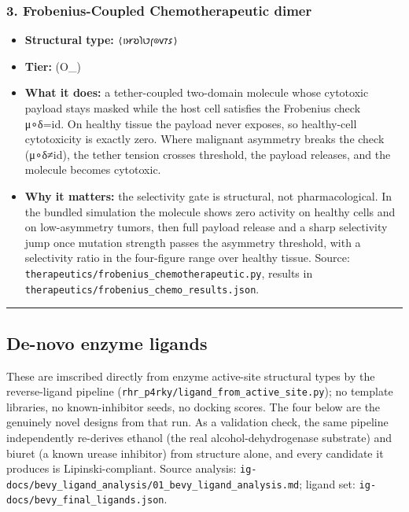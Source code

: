 \hypertarget{frobenius-coupled-chemotherapeutic-dimer}{%
\subsubsection{3. Frobenius-Coupled Chemotherapeutic
dimer}\label{frobenius-coupled-chemotherapeutic-dimer}}

\begin{itemize}
\tightlist
\item
  \textbf{Structural type:} \texttt{⟨𐑦𐑶𐑾𐑹𐑐𐑧𐑲𐑝⊙𐑫𐑳𐑭⟩}
\item
  \textbf{Tier:} (O\_\infty)
\item
  \textbf{What it does:} a tether-coupled two-domain molecule whose
  cytotoxic payload stays masked while the host cell satisfies the
  Frobenius check μ∘δ=id. On healthy tissue the payload never exposes,
  so healthy-cell cytotoxicity is exactly zero. Where malignant
  asymmetry breaks the check (μ∘δ≠id), the tether tension crosses
  threshold, the payload releases, and the molecule becomes cytotoxic.
\item
  \textbf{Why it matters:} the selectivity gate is structural, not
  pharmacological. In the bundled simulation the molecule shows zero
  activity on healthy cells and on low-asymmetry tumors, then full
  payload release and a sharp selectivity jump once mutation strength
  passes the asymmetry threshold, with a selectivity ratio in the
  four-figure range over healthy tissue. Source:
  \texttt{therapeutics/frobenius\_chemotherapeutic.py}, results in
  \texttt{therapeutics/frobenius\_chemo\_results.json}.
\end{itemize}

\begin{center}\rule{0.5\linewidth}{0.5pt}\end{center}

\hypertarget{de-novo-enzyme-ligands}{%
\subsection{De-novo enzyme ligands}\label{de-novo-enzyme-ligands}}

These are imscribed directly from enzyme active-site structural types by
the reverse-ligand pipeline
(\texttt{rhr\_p4rky/ligand\_from\_active\_site.py}); no template
libraries, no known-inhibitor seeds, no docking scores. The four below
are the genuinely novel designs from that run. As a validation check,
the same pipeline independently re-derives ethanol (the real
alcohol-dehydrogenase substrate) and biuret (a known urease inhibitor)
from structure alone, and every candidate it produces is
Lipinski-compliant. Source analysis:
\texttt{ig-docs/bevy\_ligand\_analysis/01\_bevy\_ligand\_analysis.md};
ligand set: \texttt{ig-docs/bevy\_final\_ligands.json}.

